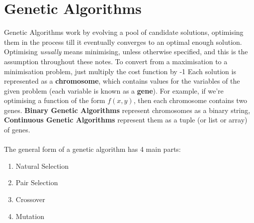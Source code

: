 \section{Genetic Algorithms}

Genetic Algorithms work by evolving a pool of candidate solutions, optimising them in the process till it eventually converges to an optimal enough solution. Optimising \textit{usually} means minimising, unless otherwise specified, and this is the assumption throughout these notes. To convert from a maximisation to a minimisation problem, just multiply the cost function by -1
Each solution is represented as a \textbf{chromosome}, which contains values for the variables of the given problem (each variable is known as a \textbf{gene}). For example, if we're optimising a function of the form \( f(x,y) \), then each chromosome contains two genes. \textbf{Binary Genetic Algorithms} represent chromosomes as a binary string, \textbf{Continuous Genetic Algorithms} represent them as a tuple (or list or array) of genes.
\\ \\
The general form of a genetic algorithm has 4 main parts:
\begin{enumerate}
    \item Natural Selection
    \item Pair Selection
    \item Crossover
    \item Mutation
\end{enumerate}

